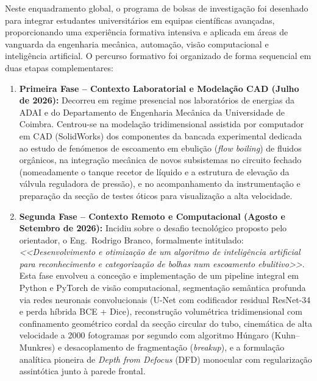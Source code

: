 Neste enquadramento global, o programa de bolsas de investigação foi desenhado para integrar estudantes universitários em equipas científicas avançadas, proporcionando uma experiência formativa intensiva e aplicada em áreas de vanguarda da engenharia mecânica, automação, visão computacional e inteligência artificial. O percurso formativo foi organizado de forma sequencial em duas etapas complementares:
\begin{enumerate}
    \item \textbf{Primeira Fase -- Contexto Laboratorial e Modelação CAD (Julho de 2026):} Decorreu em regime presencial nos laboratórios de energias da ADAI e do Departamento de Engenharia Mecânica da Universidade de Coimbra. Centrou-se na modelação tridimensional assistida por computador em CAD (SolidWorks\textregistered) dos componentes da bancada experimental dedicada ao estudo de fenómenos de escoamento em ebulição (\emph{flow boiling}) de fluidos orgânicos, na integração mecânica de novos subsistemas no circuito fechado (nomeadamente o tanque recetor de líquido e a estrutura de elevação da válvula reguladora de pressão), e no acompanhamento da instrumentação e preparação da secção de testes óticos para visualização a alta velocidade.
    \item \textbf{Segunda Fase -- Contexto Remoto e Computacional (Agosto e Setembro de 2026):} Incidiu sobre o desafio tecnológico proposto pelo orientador, o Eng.~Rodrigo Branco, formalmente intitulado: \emph{<<Desenvolvimento e otimização de um algoritmo de inteligência artificial para reconhecimento e categorização de bolhas num escoamento ebulitivo>>}. Esta fase envolveu a conceção e implementação de um pipeline integral em Python e PyTorch de visão computacional, segmentação semântica profunda via redes neuronais convolucionais (U-Net com codificador residual ResNet-34 e perda híbrida BCE + Dice), reconstrução volumétrica tridimensional com confinamento geométrico cordal da secção circular do tubo, cinemática de alta velocidade a 2000 fotogramas por segundo com algoritmo Húngaro (Kuhn--Munkres) e desacoplamento de fragmentação (\emph{breakup}), e a formulação analítica pioneira de \emph{Depth from Defocus} (DFD) monocular com regularização assintótica junto à parede frontal.
\end{enumerate}

